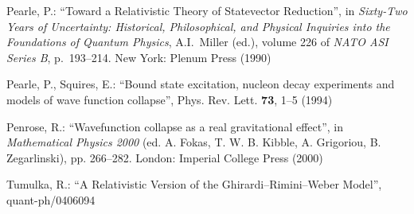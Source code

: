 \documentclass[12pt]{article}
\newcommand{\1}{1}
\begin{document}
\begin{thebibliography}{[20]}
 Pearle, P.: ``Toward a Relativistic Theory of Statevector
  Reduction'', in \textit{Sixty-Two Years of Uncertainty: Historical,
  Philosophical, and Physical Inquiries into the Foundations of
  Quantum Physics}, A.I.~Miller (ed.), volume 226 of \textit{NATO ASI
  Series B}, p.~193--214. New York: Plenum Press (1990)

 Pearle, P., Squires, E.: ``Bound state excitation, nucleon 
   decay experiments and models of wave function collapse'',
   Phys. Rev. Lett. \textbf{73}, 1--5 (1994)

 Penrose, R.: ``Wavefunction collapse as a real
   gravitational effect'', in \textit{Mathematical Physics 2000} (ed.
   A. Fokas, T. W. B. Kibble, A. Grigoriou, B. Zegarlinski), pp. 266--282.
   London: Imperial College Press (2000)


 Tumulka, R.: ``A Relativistic Version of the 
   Ghirardi--Rimini--Weber Model'', quant-ph/0406094

\end{thebibliography}
\end{document}
